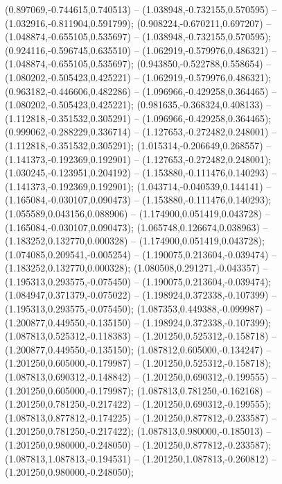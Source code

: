  (0.897069,-0.744615,0.740513) -- (1.038948,-0.732155,0.570595) -- (1.032916,-0.811904,0.591799);
 (0.908224,-0.670211,0.697207) -- (1.048874,-0.655105,0.535697) -- (1.038948,-0.732155,0.570595);
 (0.924116,-0.596745,0.635510) -- (1.062919,-0.579976,0.486321) -- (1.048874,-0.655105,0.535697);
 (0.943850,-0.522788,0.558654) -- (1.080202,-0.505423,0.425221) -- (1.062919,-0.579976,0.486321);
 (0.963182,-0.446606,0.482286) -- (1.096966,-0.429258,0.364465) -- (1.080202,-0.505423,0.425221);
 (0.981635,-0.368324,0.408133) -- (1.112818,-0.351532,0.305291) -- (1.096966,-0.429258,0.364465);
 (0.999062,-0.288229,0.336714) -- (1.127653,-0.272482,0.248001) -- (1.112818,-0.351532,0.305291);
 (1.015314,-0.206649,0.268557) -- (1.141373,-0.192369,0.192901) -- (1.127653,-0.272482,0.248001);
 (1.030245,-0.123951,0.204192) -- (1.153880,-0.111476,0.140293) -- (1.141373,-0.192369,0.192901);
 (1.043714,-0.040539,0.144141) -- (1.165084,-0.030107,0.090473) -- (1.153880,-0.111476,0.140293);
 (1.055589,0.043156,0.088906) -- (1.174900,0.051419,0.043728) -- (1.165084,-0.030107,0.090473);
 (1.065748,0.126674,0.038963) -- (1.183252,0.132770,0.000328) -- (1.174900,0.051419,0.043728);
 (1.074085,0.209541,-0.005254) -- (1.190075,0.213604,-0.039474) -- (1.183252,0.132770,0.000328);
 (1.080508,0.291271,-0.043357) -- (1.195313,0.293575,-0.075450) -- (1.190075,0.213604,-0.039474);
 (1.084947,0.371379,-0.075022) -- (1.198924,0.372338,-0.107399) -- (1.195313,0.293575,-0.075450);
 (1.087353,0.449388,-0.099987) -- (1.200877,0.449550,-0.135150) -- (1.198924,0.372338,-0.107399);
 (1.087813,0.525312,-0.118383) -- (1.201250,0.525312,-0.158718) -- (1.200877,0.449550,-0.135150);
 (1.087812,0.605000,-0.134247) -- (1.201250,0.605000,-0.179987) -- (1.201250,0.525312,-0.158718);
 (1.087813,0.690312,-0.148842) -- (1.201250,0.690312,-0.199555) -- (1.201250,0.605000,-0.179987);
 (1.087813,0.781250,-0.162168) -- (1.201250,0.781250,-0.217422) -- (1.201250,0.690312,-0.199555);
 (1.087813,0.877812,-0.174225) -- (1.201250,0.877812,-0.233587) -- (1.201250,0.781250,-0.217422);
 (1.087813,0.980000,-0.185013) -- (1.201250,0.980000,-0.248050) -- (1.201250,0.877812,-0.233587);
 (1.087813,1.087813,-0.194531) -- (1.201250,1.087813,-0.260812) -- (1.201250,0.980000,-0.248050);
